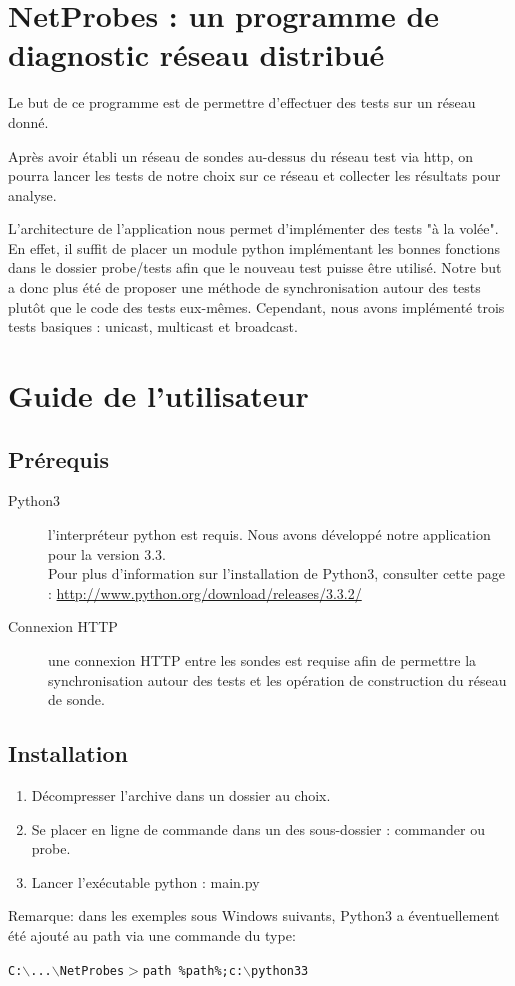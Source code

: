 \documentclass[a4paper,11pt]{article}
\begin{document}


\tableofcontents

\section{NetProbes : un programme de diagnostic réseau distribué}
Le but de ce programme est de permettre d'effectuer des tests sur un réseau donné.

Après avoir établi un réseau de sondes au-dessus du réseau test via http, on pourra lancer les tests de notre choix sur ce réseau et collecter les résultats pour analyse.

L'architecture de l'application nous permet d'implémenter des tests "à la volée". En effet, il suffit de placer un module python implémentant les bonnes fonctions dans le dossier probe/tests afin que le nouveau test puisse être utilisé. Notre but a donc plus été de proposer une méthode de synchronisation autour des tests plutôt que le code des tests eux-mêmes. Cependant, nous avons implémenté trois tests basiques : unicast, multicast et broadcast.

\section{Guide de l'utilisateur}

\subsection{Prérequis}
\begin{description}
\item[Python3] l'interpréteur python est requis. Nous avons développé notre application pour la version 3.3.\\
Pour plus d'information sur l'installation de Python3, consulter cette page : \href{http://www.python.org/download/releases/3.3.2/}{http://www.python.org/download/releases/3.3.2/}
\item[Connexion HTTP] une connexion HTTP entre les sondes est requise afin de permettre la synchronisation autour des tests et les opération de construction du réseau de sonde.
\end{description}

\subsection{Installation}
\begin{enumerate}
\item Décompresser l'archive dans un dossier au choix.
\item Se placer en ligne de commande dans un des sous-dossier : commander ou probe.
\item Lancer l'exécutable python : main.py
\end{enumerate}
Remarque: dans les exemples sous Windows suivants, Python3 a éventuellement été ajouté au path via une commande du type:
\begin{center} \texttt{{\color{blue}C:$\backslash$...$\backslash$NetProbes$>$}path \%path\%;c:$\backslash$python33} \end{center}
\end{document}
